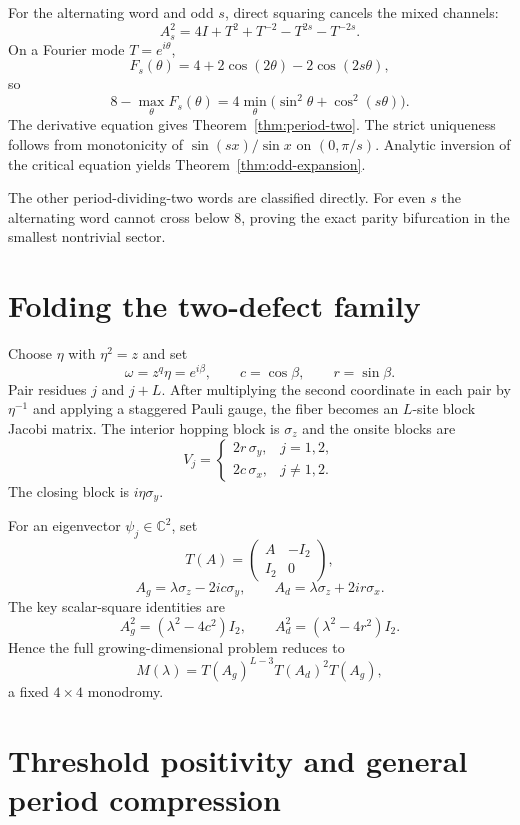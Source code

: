 \documentclass[11pt]{article}
\theoremstyle{remark}
\begin{document}
For the alternating word and odd $s$, direct squaring cancels the mixed
channels:
\[
 A_s^2=4I+T^2+T^{-2}-T^{2s}-T^{-2s}.
\]
On a Fourier mode $T=e^{i\theta}$,
\[
 F_s(\theta)=4+2\cos(2\theta)-2\cos(2s\theta),
\]
so
\[
 8-\max_\theta F_s(\theta)
 =4\min_\theta
 \bigl(\sin^2\theta+\cos^2(s\theta)\bigr).
\]
The derivative equation gives Theorem~\ref{thm:period-two}.  The strict
uniqueness follows from monotonicity of
$\sin(sx)/\sin x$ on $(0,\pi/s)$.  Analytic inversion of the critical
equation yields Theorem~\ref{thm:odd-expansion}.

The other period-dividing-two words are classified directly.  For even $s$
the alternating word cannot cross below $8$, proving the exact parity
bifurcation in the smallest nontrivial sector.

\section{Folding the two-defect family}
\label{sec:folding}

Choose $\eta$ with $\eta^2=z$ and set
\[
 \omega=z^q\eta=e^{i\beta},
 \qquad c=\cos\beta,
 \qquad r=\sin\beta.
\]
Pair residues $j$ and $j+L$.  After multiplying the second coordinate in
each pair by $\eta^{-1}$ and applying a staggered Pauli gauge, the fiber
becomes an $L$-site block Jacobi matrix.  The interior hopping block is
$\sigma_z$ and the onsite blocks are
\begin{equation}
 V_j=\begin{cases}
 2r\,\sigma_y,&j=1,2,\\
 2c\,\sigma_x,&j\ne1,2.
 \end{cases}
 \label{eq:onsite-blocks}
\end{equation}
The closing block is $i\eta\sigma_y$.

For an eigenvector $\psi_j\in\mathbb C^2$, set
\[
 T(A)=\begin{pmatrix}A&-I_2\\I_2&0\end{pmatrix},
\]
\[
 A_g=\lambda\sigma_z-2ic\sigma_y,
 \qquad
 A_d=\lambda\sigma_z+2ir\sigma_x.
\]
The key scalar-square identities are
\[
 A_g^2=(\lambda^2-4c^2)I_2,
 \qquad
 A_d^2=(\lambda^2-4r^2)I_2.
\]
Hence the full growing-dimensional problem reduces to
\begin{equation}
 M(\lambda)=T(A_g)^{L-3}T(A_d)^2T(A_g),
 \label{eq:monodromy}
\end{equation}
a fixed $4\times4$ monodromy.

\section{Threshold positivity and general period compression}
\label{sec:compression-proof}
\end{document}
